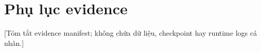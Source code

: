 \documentclass[12pt,a4paper,oneside]{book}
\begin{document}
\frontmatter

\tableofcontents
\listoffigures
\listoftables
\mainmatter





\printbibliography[heading=bibintoc,title={Tài liệu tham khảo}]
\appendix
\chapter{Phụ lục evidence}
[Tóm tắt evidence manifest; không chứa dữ liệu, checkpoint hay runtime logs cá nhân.]
\end{document}
